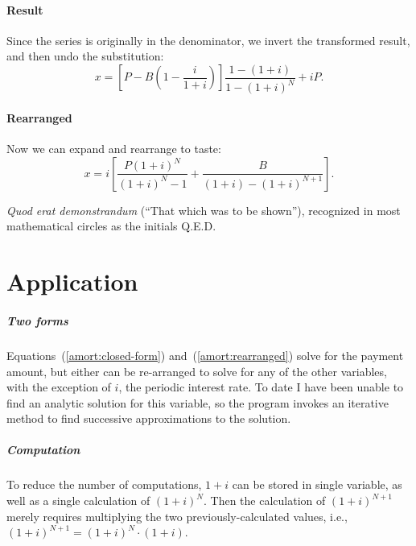 \paragraph{Result}
Since the series is originally in the denominator, we invert the transformed
result, and then undo the substitution:
\begin{equation}
\label{amort:closed-form}
x = \left[P-B\left(1-\frac{i}{1+i}\right)\right]\frac{1-(1+i)}{1 - (1+i)^N}
 + iP.
\end{equation}
\paragraph{Rearranged}
Now we can expand and rearrange to taste:
\begin{equation}
\label{amort:rearranged}
x = i \left[\frac{P(1+i)^N}{(1+i)^N - 1} 
  + \frac{B}{(1+i) - (1+i)^{N+1}}\right].
\end{equation}


\begin{finalsquare}
\noindent\textit{Quod erat demonstrandum} (``That which was to be
shown''), recognized in most mathematical circles as the initials Q.E.D.
\end{finalsquare}

\section{Application}
\subparagraph{Two forms}
Equations~(\ref{amort:closed-form}) and~(\ref{amort:rearranged})
solve for the payment amount, but either can be re-arranged to solve
for any of the other variables, with the exception of $i$, the
periodic interest rate.  To date I have been unable to find an
analytic solution for this variable, so the program invokes an
iterative method to find successive approximations to the solution.

\subparagraph{Computation}
To reduce the number of computations, $1+i$ can be stored in 
single variable, as well as a single calculation of $(1+i)^N$.
Then the calculation of $(1+i)^{N+1}$ merely requires multiplying the two
previously-calculated values, i.e., $(1+i)^{N+1} = (1+i)^N \cdot (1+i)$.

